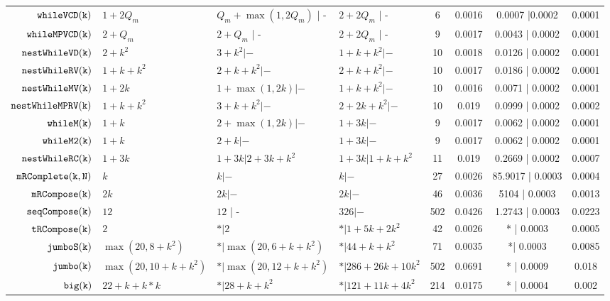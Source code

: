 {\begin {table}[H]
\begin{center}
{\begin{tabular}{ r | l | l | l | c | c | c | c  }
         $  {\mathtt{whileVCD(k)}} $ & ${1 + 2Q_m}$ &  ${Q_m+\max(1,2Q_m)}$ | - & $2+2Q_m$ | -  &  6 & 0.0016 & 0.0007 |0.0002 & 0.0001 \\
         $ {\mathtt{whileMPVCD(k)}}$ & $2+Q_m$ &  $2 + Q_m$ | - & $2+2Q_m$ | -  &   9 & 0.0017 & 0.0043 | 0.0002 & 0.0001 \\
         $  \mathtt{nestWhileVD(k)}$ & $2 + k^2$ &   $3 + k^2| -$ & $1 + k + k^2|- $   &  10 & 0.0018 & 0.0126 | 0.0002 & 0.0001  \\
         $  \mathtt{nestWhileRV(k)}$ & $1 + k +  k^2$ &  
         $ 2 + k +  k^2 | -$ 
         &  $2 + k + k^2| -$   &  10 & 0.0017 & 0.0186 | 0.0002 & 0.0001  \\
         $  \mathtt{nestWhileMV(k)}$ & $1 + 2k $ & $1 + \max(1,2k) | -$ &  $1 + k + k^2 |-$  & 10 & 0.0016 & 0.0071 | 0.0002 & 0.0001 \\
         $ \mathtt{nestWhileMPRV(k)}$ & $1 + k + k^2$ &  $3 + k + k^2  | -$ &  $2 + 2k + k^2 | - $  &  10 & 0.019 & 0.0999 | 0.0002 & 0.0002 \\
         {$ \mathtt{whileM(k)}$} & $1 + k$ &  $ 2 + \max(1,2k) | -$ & $1 + 3k | - $  &  9 & 0.0017 & 0.0062 | 0.0002 & 0.0001  \\
         {$ \mathtt{whileM2(k)}$} & $1 + k$ &  $ 2 + k | -$ & $1 + 3k | - $  &  9 & 0.0017 & 0.0062 | 0.0002 & 0.0001  \\
         {$\mathtt{nestWhileRC(k)}$} & $1 + 3k$ &  $1 + 3k | 2 + 3k + k^2$ &  $1 + 3k | 1 + k + k^2$  &  11 & 0.019 & 0.2669 | 0.0002 & 0.0007 \\
         $  \mathtt{mRComplete(k, N)}$ & $k$ & $ k | -  $ & $k |-$   &  27 & 0.0026 & 85.9017 | 0.0003 & 0.0004 \\
        $  \mathtt{mRCompose(k)}$ & $2k$ & $  2k | -$ & $ 2k | -$   &  46 & 0.0036 & 5104 | 0.0003 &  0.0013\\
         $  \mathtt{seqCompose(k)}$ & $12$ & $12  $ | - & $326 | -$  &  502 & 0.0426  & 1.2743 | 0.0003 & 0.0223 \\
         $  \mathtt{tRCompose(k)}$ & $2$ &  $ * | 2$ & $* | 1 + 5k + 2 k^2 $  &  42 & 0.0026 & * | 0.0003 & 0.0005\\
         $  \mathtt{{jumboS(k)}}$ & $ \max(20, 8+k^2)$ &  $ * | \max(20, 6+k+k^2)$   &   $* | {44+k+k^2} $  &  71 & 0.0035 & *| 0.0003 &  0.0085 \\
         $  \mathtt{jumbo(k)}$ & $ \max(20, 10+k+k^2 )$ &   $* | \max(20, 12 + k+ k^2)$  &  $* |286+26k+10k^2$   &  502 & 0.0691 & * | 0.0009 & 0.018 \\
         $  {\mathtt{big(k)}} $ & $22+k+k*k$ &  $* |28 + k + k^2$ &  $* |121+11k+4k^2 $  &  214 & 0.0175 & * | 0.0004 & 0.002 
        \end{tabular}
}
\end{center}
\end{table}
}